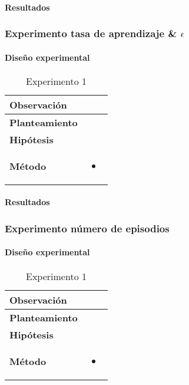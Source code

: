 \paragraph{Resultados}

\subsubsection{Experimento tasa de aprendizaje \& \(\epsilon\)}

\paragraph{Diseño experimental}

\begin{table}[H]
    \centering
    \begin{tabularx}{\textwidth}{|p{4cm}|X|} %
        \hline %
        \textbf{Observación} &  
        \\ \hline 
        \textbf{Planteamiento} & 
        \\ \hline 
        \textbf{Hipótesis} & 
        \\ \hline 
        \textbf{Método} & 
        \begin{itemize}
            \item 
        \end{itemize}
        \\ \hline
    \end{tabularx}
    \caption{Experimento 1}
    \label{tab:tabla1}
\end{table}

\paragraph{Resultados}

\subsubsection{Experimento número de episodios}

\paragraph{Diseño experimental}

\begin{table}[H]
    \centering
    \begin{tabularx}{\textwidth}{|p{4cm}|X|} %
        \hline %
        \textbf{Observación} &  
        \\ \hline 
        \textbf{Planteamiento} & 
        \\ \hline 
        \textbf{Hipótesis} & 
        \\ \hline 
        \textbf{Método} & 
        \begin{itemize}
            \item 
        \end{itemize}
        \\ \hline
    \end{tabularx}
    \caption{Experimento 1}
    \label{tab:tabla1}
\end{table}

